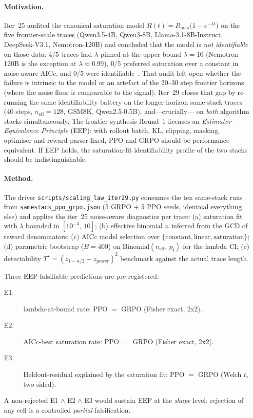 \documentclass{article}
\begin{document}
\paragraph{Motivation.}
Iter~25 audited the canonical saturation model
$R(t)=R_{\max}\bigl(1-e^{-\lambda t}\bigr)$ on the five frontier-scale
traces (Qwen3.5-4B, Qwen3-8B, Llama-3.1-8B-Instruct, DeepSeek-V3.1,
Nemotron-120B) and concluded that the model is \emph{not identifiable}
on those data: 4/5 traces had $\lambda$ pinned at the upper bound
$\lambda=10$ (Nemotron-120B is the exception at $\lambda\!\approx\!0.99$),
0/5 preferred saturation over a constant in noise-aware
AICc, and 0/5 were identifiable~\citep{tinker-rl-lab-iter25}.
That audit left open whether the failure is intrinsic to the model or
an artefact of the 20--30 step frontier horizons (where the noise floor
is comparable to the signal). Iter~29 closes that gap by re-running the
same identifiability battery on the longer-horizon same-stack traces
(40 steps, $n_{\mathrm{eff}}=128$, GSM8K, Qwen2.5-0.5B), and---crucially---
on \emph{both} algorithm stacks simultaneously. The frontier synthesis
Round~1 licenses an \emph{Estimator-Equivalence Principle} (EEP): with
rollout batch, KL, clipping, masking, optimiser and reward parser fixed,
PPO and GRPO should be performance-equivalent. If EEP holds, the
saturation-fit identifiability profile of the two stacks should be
indistinguishable.

\paragraph{Method.}
The driver \texttt{scripts/scaling\_law\_iter29.py} consumes the ten
same-stack runs from \texttt{samestack\_ppo\_grpo.json} (5 GRPO + 5 PPO
seeds, identical everything else) and applies the iter~25 noise-aware
diagnostics per trace:
(a) saturation fit with $\lambda$ bounded in $[10^{-3},\,10]$; (b)
effective binomial $n$ inferred from the GCD of reward denominators;
(c) AICc model selection over $\{\text{constant}, \text{linear},
\text{saturation}\}$; (d) parametric bootstrap ($B=400$) on
$\mathrm{Binomial}(n_{\mathrm{eff}},\,p_t)$ for the lambda CI; (e)
detectability $T^{\star}=(z_{1-\alpha/2}+z_{\mathrm{power}})^{2}$
benchmark against the actual trace length.

Three EEP-falsifiable predictions are pre-registered:
\begin{description}
\item[E1.] lambda-at-bound rate: PPO $=$ GRPO (Fisher exact, 2x2).
\item[E2.] AICc-best saturation rate: PPO $=$ GRPO (Fisher exact, 2x2).
\item[E3.] Heldout-residual explained by the saturation fit:
  PPO $=$ GRPO (Welch $t$, two-sided).
\end{description}
A non-rejected E1 $\wedge$ E2 $\wedge$ E3 would sustain EEP at the
\emph{shape} level; rejection of any cell is a controlled
\emph{partial} falsification.
\end{document}
